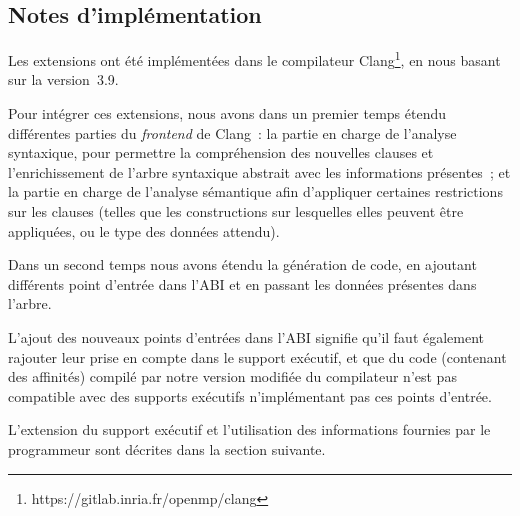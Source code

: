\subsection{Notes d'implémentation}

Les extensions ont été implémentées dans le compilateur Clang\footnote{https://gitlab.inria.fr/openmp/clang}, en nous basant sur la version~3.9.

Pour intégrer ces extensions, nous avons dans un premier temps étendu différentes parties du \emph{frontend} de Clang~: la partie en charge de l'analyse syntaxique, pour permettre la compréhension des nouvelles clauses et l'enrichissement de l'arbre syntaxique abstrait avec les informations présentes~;
et la partie en charge de l'analyse sémantique afin d'appliquer certaines restrictions sur les clauses (telles que les constructions sur lesquelles elles peuvent être appliquées, ou le type des données attendu).

Dans un second temps nous avons étendu la génération de code, en ajoutant différents point d'entrée dans l'ABI et en passant les données présentes dans l'arbre.

L'ajout des nouveaux points d'entrées dans l'ABI signifie qu'il faut également rajouter leur prise en compte dans le support exécutif, et que du code (contenant des affinités) compilé par notre version modifiée du compilateur n'est pas compatible avec des supports exécutifs n'implémentant pas ces points d'entrée.


L'extension du support exécutif et l'utilisation des informations fournies par le programmeur sont décrites dans la section suivante.
